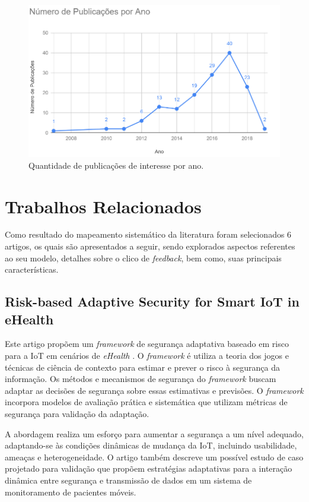 \documentclass[tid,table]{texufpel} %
\begin{document}
\begin{figure}[ht]
	\centering
	\includegraphics[width=.9\textwidth]{imagens/grafPublicaAno.png}
	\caption{Quantidade de publicações de interesse por ano.}
	\label{fig:grafPublicaAno}
\end{figure}

\section{Trabalhos Relacionados}

Como resultado do mapeamento sistemático da literatura foram selecionados 6 artigos, os quais são apresentados a seguir, sendo explorados aspectos referentes ao seu modelo, detalhes sobre o clico de \textit{feedback}, bem como, suas principais características. 


\subsection{Risk-based Adaptive Security for Smart IoT in eHealth} %

Este artigo propõem um \textit{framework} de segurança adaptativa baseado em risco para a IoT em cenários de \textit{eHealth} \cite{habtamu12}. O \textit{framework} é utiliza a teoria dos jogos e técnicas de ciência de contexto para estimar e prever o risco à segurança da informação. Os métodos e mecanismos de segurança do \textit{framework} buscam adaptar as decisões de segurança sobre essas estimativas e previsões. O \textit{framework} incorpora modelos de avaliação prática e sistemática que utilizam métricas de segurança para validação da adaptação.

A abordagem realiza um esforço para aumentar a segurança a um nível adequado, adaptando-se às condições dinâmicas de mudança da IoT, incluindo usabilidade, ameaças e heterogeneidade. O artigo também descreve um possível estudo de caso projetado para validação que propõem estratégias adaptativas para a interação dinâmica entre segurança e transmissão de dados em um sistema de monitoramento de pacientes móveis.
\end{document}
